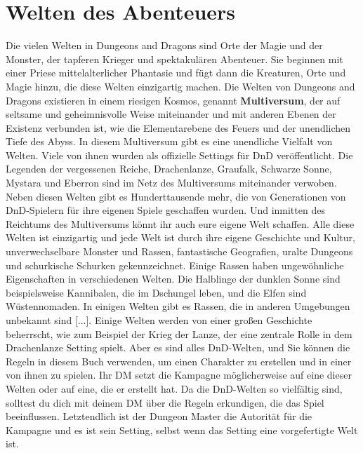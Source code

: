 \section{Welten des Abenteuers}
Die vielen Welten in Dungeons and Dragons sind Orte der Magie und der Monster, der tapferen Krieger und spektakulären Abenteuer. Sie beginnen mit einer Priese mittelalterlicher Phantasie und fügt dann die Kreaturen, Orte und Magie hinzu, die diese Welten einzigartig machen.
Die Welten von Dungeons and Dragons existieren in einem riesigen Kosmos, genannt \textbf{Multiversum}, der auf seltsame und geheimnisvolle Weise miteinander und mit anderen Ebenen der Existenz verbunden ist, wie die Elementarebene des Feuers und der unendlichen Tiefe des Abyss. In diesem Multiversum gibt es eine unendliche Vielfalt von Welten.
Viele von ihnen wurden als offizielle Settings für DnD veröffentlicht. Die Legenden der vergessenen Reiche, Drachenlanze, Graufalk, Schwarze Sonne, Mystara und Eberron sind im Netz des Multiversums miteinander verwoben. Neben diesen Welten gibt es Hunderttausende mehr, die von Generationen von DnD-Spielern für ihre eigenen Spiele geschaffen wurden. Und inmitten des Reichtums des Multiversums könnt ihr auch eure eigene Welt schaffen.
Alle diese Welten ist einzigartig und jede Welt ist durch ihre eigene Geschichte und Kultur, unverwechselbare Monster und Rassen, fantastische Geografien, uralte Dungeons und schurkische Schurken gekennzeichnet. Einige Rassen haben ungewöhnliche Eigenschaften in verschiedenen Welten. Die Halblinge der dunklen Sonne sind beispielsweise Kannibalen, die im Dschungel leben, und die Elfen sind Wüstennomaden. In einigen Welten gibt es Rassen, die in anderen Umgebungen unbekannt sind [...]. Einige Welten werden von einer großen Geschichte beherrscht, wie zum Beispiel der Krieg der Lanze, der eine zentrale Rolle in dem Drachenlanze Setting spielt. Aber es sind alles DnD-Welten, und Sie können die Regeln in diesem Buch verwenden, um einen Charakter zu erstellen und in einer von ihnen zu spielen. Ihr DM setzt die Kampagne möglicherweise auf eine dieser Welten oder auf eine, die er erstellt hat. Da die DnD-Welten so vielfältig sind, solltest du dich mit deinem DM über die Regeln erkundigen, die das Spiel beeinflussen. Letztendlich ist der Dungeon Master die Autorität für die Kampagne und es ist sein Setting, selbst wenn das Setting eine vorgefertigte Welt ist.
\newpage
